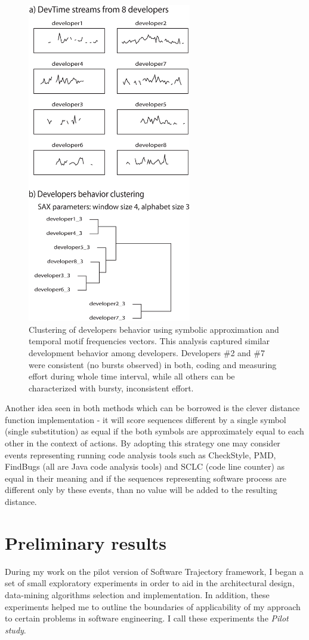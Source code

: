 \documentclass{sig-alternate}
\begin{document}
\begin{figure}[ht]
   \centering
   \includegraphics[height=140mm]{dev_clustering_vertical.eps}
   \caption{Clustering of developers behavior using symbolic approximation and temporal motif frequencies vectors. This analysis captured similar development behavior among developers. Developers \#2 and \#7 were consistent (no bursts observed) in both, coding and measuring effort during whole time interval, while all others can be characterized with bursty, inconsistent effort.}
   \label{fig:cluster_developers}
\end{figure}

Another idea seen in both methods which can be borrowed is the clever distance function implementation - it will score sequences different by a single symbol (single substitution) as equal if the both symbols are approximately equal to each other in the context of actions. By adopting this strategy one may consider events representing running code analysis tools such as CheckStyle, PMD, FindBugs (all are Java code analysis tools) and SCLC (code line counter) as equal in their meaning and if the sequences representing software process are different only by these events, than no value will be added to the resulting distance.

\section{Preliminary results}\label{results}
During my work on the pilot version of Software Trajectory framework, I began a set of small exploratory experiments in order to aid in the architectural design, data-mining algorithms selection and implementation. In addition, these experiments helped me to outline the boundaries of applicability of my approach to certain problems in software engineering. I call these experiments the \textit{Pilot study}.
\end{document}
